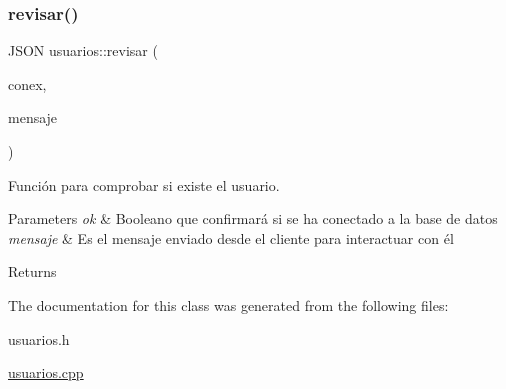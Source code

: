 \subsubsection{\texorpdfstring{revisar()}{revisar()}}
{\footnotesize\ttfamily J\+S\+ON usuarios\+::revisar (\begin{DoxyParamCaption}\item[{bool}]{conex,  }\item[{J\+S\+ON}]{mensaje }\end{DoxyParamCaption})}



Función para comprobar si existe el usuario. 


\begin{DoxyParams}{Parameters}
{\em ok} & Booleano que confirmará si se ha conectado a la base de datos \\
\hline
{\em mensaje} & Es el mensaje enviado desde el cliente para interactuar con él \\
\hline
\end{DoxyParams}
\begin{DoxyReturn}{Returns}

\end{DoxyReturn}


The documentation for this class was generated from the following files\+:\begin{DoxyCompactItemize}
\item 
usuarios.\+h\item 
\mbox{\hyperlink{usuarios_8cpp}{usuarios.\+cpp}}\end{DoxyCompactItemize}
